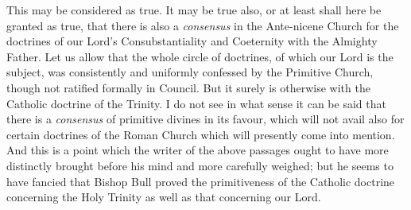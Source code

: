 This may be considered as true. It may be true also,
or at least shall here be granted as true, that there is
also a \emph{consensus} in the Ante-nicene Church for the
doctrines of our Lord's Consubstantiality and Coeternity
with the Almighty Father. Let us allow that the whole
circle of doctrines, of which our Lord is the subject,
was consistently and uniformly confessed by the Primitive
Church, though not ratified formally in Council. But it
surely is otherwise with the Catholic doctrine of the
Trinity. I do not see in what sense it can be said that
there is a \emph{ consensus} of primitive divines in its favour,
which will not avail also for certain doctrines of the
Roman Church which will presently come into mention. And
this is a point which the writer of the above passages
ought to have more distinctly brought before his mind and
more carefully weighed; but he seems to have fancied that
Bishop Bull proved the primitiveness of the Catholic
doctrine concerning the Holy Trinity as well as that
concerning our Lord.

